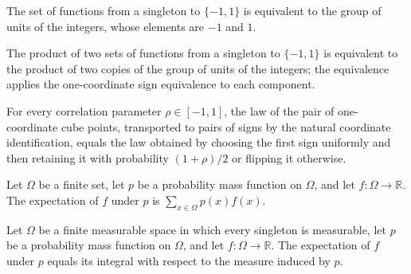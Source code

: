 \begin{definition}
\label{FABL.signCubeOneEquiv}
\leanok
{}
The set of functions from a singleton to $\{−1,1\}$ is equivalent to the group of units
of the integers, whose elements are $−1$ and $1$.
\end{definition}

\begin{definition}
\label{FABL.signPairCubeOneEquiv}
\leanok
{}
The product of two sets of functions from a singleton to $\{−1,1\}$ is equivalent to the
product of two copies of the group of units of the integers; the equivalence applies the
one-coordinate sign equivalence to each component.
\end{definition}

\begin{theorem}
\label{FABL.correlatedPairPMF_one_map_signPairCubeOneEquiv}
\leanok
{}
For every correlation parameter $\rho\in[-1,1]$, the law of the pair of one-coordinate
cube points, transported to pairs of signs by the natural coordinate identification,
equals the law obtained by choosing the first sign uniformly and then retaining it with
probability $(1+\rho)/2$ or flipping it otherwise.
\end{theorem}

\begin{definition}
\label{FABL.pmfExpectation}
\leanok
Let $\Omega$ be a finite set, let $p$ be a probability mass function on $\Omega$, and
let $f\colon\Omega\to\mathbb{R}$. The expectation of $f$ under $p$ is
$\sum_{x\in\Omega}p(x)f(x)$.
\end{definition}

\begin{theorem}
\label{FABL.pmfExpectation_eq_integral}
\leanok
{}
Let $\Omega$ be a finite measurable space in which every singleton is measurable, let
$p$ be a probability mass function on $\Omega$, and let $f:\Omega\to\mathbb{R}$. The
expectation of $f$ under $p$ equals its integral with respect to the measure induced by
$p$.
\end{theorem}

